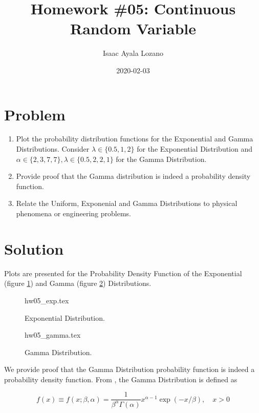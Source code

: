 \documentclass[a4paper,12pt]{article}
\title{Homework \#05: Continuous Random Variable}
\author{Isaac Ayala Lozano}
\date{2020-02-03}
\begin{document}
\maketitle

\section{Problem}
\begin{enumerate}
 \item Plot the probability distribution functions for the Exponential and Gamma Distributions.
 Consider $\lambda \in \{0.5, 1, 2\}$ for the Exponential Distribution and $\alpha \in \{2, 3, 7, 7\}, \lambda \in \{0.5, 2, 2, 1\}$ for the Gamma Distribution.
 \item Provide proof that the Gamma distribution is indeed a probability density function.
 \item Relate the Uniform, Exponenial and Gamma Distributions to physical phenomena or engineering problems.
\end{enumerate}

\pagebreak

\section{Solution}

Plots are presented for the Probability Density Function of the Exponential (figure \ref{fig: exp}) and Gamma (figure \ref{fig: gamma}) Distributions.


\begin{figure}[htb!]
\centering
{hw05_exp.tex}
\caption{Exponential Distribution.}
\label{fig: exp}
\end{figure}

\begin{figure}[htb!]
\centering
{hw05_gamma.tex}
\caption{Gamma Distribution.}
\label{fig: gamma}
\end{figure}

\pagebreak

We provide proof that the Gamma Distribution probability function is indeed a probability density function.
From \cite{stewart2009probability}, the Gamma Distribution is defined as

\begin{equation}
 f(x) \equiv f(x;\beta, \alpha) = \dfrac{1}{\beta^\alpha \Gamma(\alpha)} x^{\alpha-1} \exp(-x/\beta), \quad x>0
\end{equation}
\end{document}
